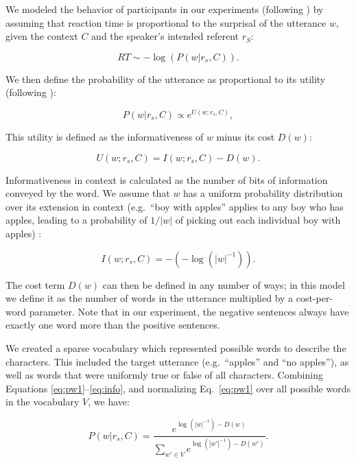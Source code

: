 \documentclass[10pt,letterpaper]{article}
\begin{document}
We modeled the behavior of participants in our experiments (following ) by assuming that reaction time is proportional to the surprisal of the utterance $w$, given the context $C$ and the speaker's intended referent $r_S$:

\begin{equation}\label{eq:surprise}
RT \sim -\log(P(w| r_s, C)).
\end{equation}

\noindent We then define the probability of the utterance as proportional to its utility (following ):

\begin{equation}\label{eq:pw1}
P(w | r_s, C) \propto  e^{U(w;r_s,C)},
\end{equation} 

\noindent This utility is defined as the informativeness of $w$ minus its cost $D(w)$:

\begin{equation}\label{eq:utility}
U(w;r_s,C) = I(w;r_s, C) - D(w).
\end{equation}

\noindent Informativeness in context is calculated as the number of bits of information conveyed by the word. We assume that $w$ has a uniform probability distribution over its extension in context (e.g.\ ``boy with apples'' applies to any boy who has apples, leading to a probability of $1/|w|$ of picking out each individual boy with apples) :

\begin{equation}\label{eq:info}
I(w;r_s, C) = -(-\log(|w|^{-1})).
\end{equation}

\noindent The cost term $D(w)$ can then be defined in any number of ways; in this model we define it as the number of words in the utterance multiplied by a cost-per-word parameter.  Note that in our experiment, the negative sentences always have exactly one word more than the positive sentences. 

We created a sparse vocabulary which represented possible words to describe the characters.  This included the target utterance (e.g.\ ``apples'' and ``no apples''), as well as words that were uniformly true or false of all characters. Combining Equations \ref{eq:pw1}--\ref{eq:info}, and normalizing Eq.\ \ref{eq:pw1} over all possible words in the vocabulary $V$, we have:

\begin{equation}\label{eq:pw2}
P(w | r_s, C) = \frac{ e^{\log(|w|^{-1}) - D(w)}} {\sum_{w' \in V}{e^{\log(|w'|^{-1}) - D(w')}}}.
\end{equation}
\end{document}
